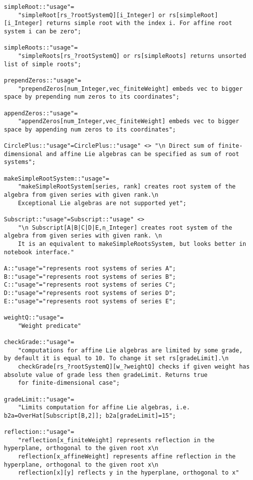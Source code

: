 \documentclass[preprint,12pt]{article}
\begin{document}
\begin{lstlisting}
simpleRoot::"usage"=
    "simpleRoot[rs_?rootSystemQ][i_Integer] or rs[simpleRoot][i_Integer] returns simple root with the index i. For affine root system i can be zero";

simpleRoots::"usage"=
    "simpleRoots[rs_?rootSystemQ] or rs[simpleRoots] returns unsorted list of simple roots";

prependZeros::"usage"=
    "prependZeros[num_Integer,vec_finiteWeight] embeds vec to bigger space by prepending num zeros to its coordinates";

appendZeros::"usage"=
    "appendZeros[num_Integer,vec_finiteWeight] embeds vec to bigger space by appending num zeros to its coordinates";

CirclePlus::"usage"=CirclePlus::"usage" <> "\n Direct sum of finite-dimensional and affine Lie algebras can be specified as sum of root systems";

makeSimpleRootSystem::"usage"=
    "makeSimpleRootSystem[series, rank] creates root system of the algebra from given series with given rank.\n
    Exceptional Lie algebras are not supported yet";

Subscript::"usage"=Subscript::"usage" <>
    "\n Subscript[A|B|C|D|E,n_Integer] creates root system of the algebra from given series with given rank. \n
    It is an equivalent to makeSimpleRootsSystem, but looks better in notebook interface."

A::"usage"="represents root systems of series A";
B::"usage"="represents root systems of series B";
C::"usage"="represents root systems of series C";
D::"usage"="represents root systems of series D";
E::"usage"="represents root systems of series E";

weightQ::"usage"=
    "Weight predicate"

checkGrade::"usage"=
    "computations for affine Lie algebras are limited by some grade, by default it is equal to 10. To change it set rs[gradeLimit].\n
    checkGrade[rs_?rootSystemQ][w_?weightQ] checks if given weight has absolute value of grade less then gradeLimit. Returns true 
    for finite-dimensional case";

gradeLimit::"usage"=
    "Limits computation for affine Lie algebras, i.e. b2a=OverHat[Subscript[B,2]]; b2a[gradeLimit]=15";

reflection::"usage"=
    "reflection[x_finiteWeight] represents reflection in the hyperplane, orthogonal to the given root x\n
    reflection[x_affineWeight] represents affine reflection in the hyperplane, orthogonal to the given root x\n
    reflection[x][y] reflects y in the hyperplane, orthogonal to x"


\end{lstlisting}
\end{document}

